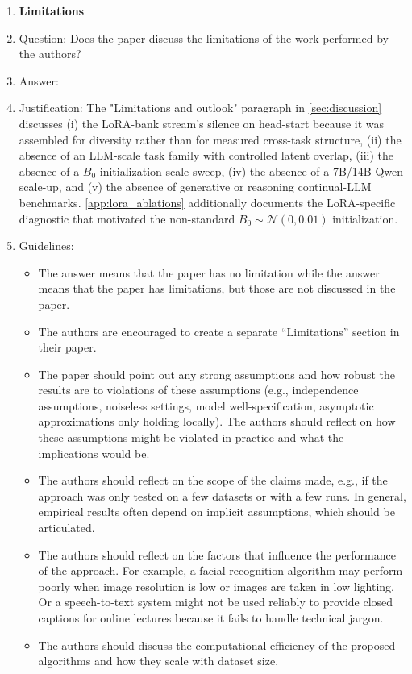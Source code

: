 \begin{enumerate}
\item {\bf Limitations}
    \item[] Question: Does the paper discuss the limitations of the work performed by the authors?
    \item[] Answer: \answerYes{}
    \item[] Justification: The "Limitations and outlook" paragraph in \cref{sec:discussion} discusses (i) the LoRA-bank stream's silence on head-start because it was assembled for diversity rather than for measured cross-task structure, (ii) the absence of an LLM-scale task family with controlled latent overlap, (iii) the absence of a $B_0$ initialization scale sweep, (iv) the absence of a 7B/14B Qwen scale-up, and (v) the absence of generative or reasoning continual-LLM benchmarks. \cref{app:lora_ablations} additionally documents the LoRA-specific diagnostic that motivated the non-standard $B_0\sim\mathcal{N}(0,0.01)$ initialization.
    \item[] Guidelines:
    \begin{itemize}
        \item The answer \answerNA{} means that the paper has no limitation while the answer \answerNo{} means that the paper has limitations, but those are not discussed in the paper.
        \item The authors are encouraged to create a separate ``Limitations'' section in their paper.
        \item The paper should point out any strong assumptions and how robust the results are to violations of these assumptions (e.g., independence assumptions, noiseless settings, model well-specification, asymptotic approximations only holding locally). The authors should reflect on how these assumptions might be violated in practice and what the implications would be.
        \item The authors should reflect on the scope of the claims made, e.g., if the approach was only tested on a few datasets or with a few runs. In general, empirical results often depend on implicit assumptions, which should be articulated.
        \item The authors should reflect on the factors that influence the performance of the approach. For example, a facial recognition algorithm may perform poorly when image resolution is low or images are taken in low lighting. Or a speech-to-text system might not be used reliably to provide closed captions for online lectures because it fails to handle technical jargon.
        \item The authors should discuss the computational efficiency of the proposed algorithms and how they scale with dataset size.

\end{itemize}
\end{enumerate}
